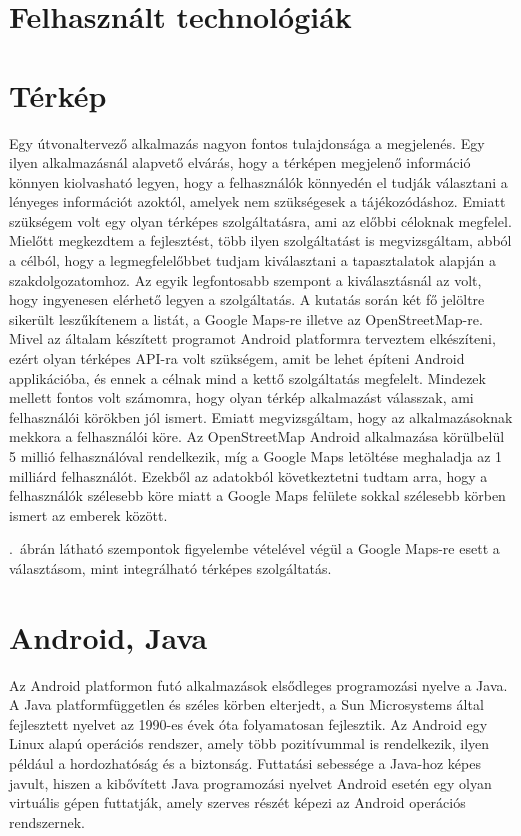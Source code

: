 	

\section{Felhasznált technológiák}
\label{felhaszntech}
\section*{Térkép}
Egy útvonaltervező alkalmazás nagyon fontos tulajdonsága a megjelenés. 
Egy ilyen alkalmazásnál alapvető elvárás, hogy a térképen megjelenő információ könnyen kiolvasható legyen, hogy a felhasználók könnyedén el tudják választani a lényeges információt azoktól, amelyek nem szükségesek a tájékozódáshoz. 
Emiatt szükségem volt egy olyan térképes szolgáltatásra, ami az előbbi céloknak megfelel. 
Mielőtt megkezdtem a fejlesztést, több ilyen szolgáltatást is megvizsgáltam, abból a célból, hogy a legmegfelelőbbet tudjam kiválasztani a tapasztalatok alapján a szakdolgozatomhoz. 
Az egyik legfontosabb szempont a kiválasztásnál az volt, hogy ingyenesen elérhető legyen a szolgáltatás. 
A kutatás során két fő jelöltre sikerült leszűkítenem a listát, a Google Maps-re illetve az OpenStreetMap-re. 
Mivel az általam készített programot Android platformra terveztem elkészíteni, ezért olyan térképes API-ra volt szükségem, amit be lehet építeni Android applikációba, és ennek a célnak mind a kettő szolgáltatás megfelelt. 
Mindezek mellett fontos volt számomra, hogy olyan térkép alkalmazást válasszak, ami felhasználói körökben jól ismert. 
Emiatt megvizsgáltam, hogy az alkalmazásoknak mekkora a felhasználói köre. 
Az OpenStreetMap Android alkalmazása körülbelül 5 millió  felhasználóval rendelkezik, míg a Google Maps letöltése meghaladja az 1 milliárd felhasználót. 
Ezekből az adatokból következtetni tudtam arra, hogy a felhasználók szélesebb köre miatt a Google Maps felülete sokkal szélesebb körben ismert az emberek között.


.\ ábrán látható szempontok figyelembe vételével végül a Google Maps-re esett a választásom, mint integrálható térképes szolgáltatás.

\section*{Android, Java}
Az Android platformon futó alkalmazások elsődleges programozási nyelve a Java.
A Java platformfüggetlen és széles körben elterjedt, a Sun Microsystems által fejlesztett nyelvet az 1990-es évek óta folyamatosan fejlesztik.
Az Android egy Linux alapú operációs rendszer, amely több pozitívummal is rendelkezik, ilyen például a hordozhatóság és a biztonság.
Futtatási sebessége a Java-hoz képes javult, hiszen a kibővített Java programozási nyelvet Android esetén egy olyan virtuális gépen futtatják, amely szerves részét képezi az Android operációs rendszernek. %

